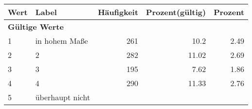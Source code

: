      \begin{longtable}{lXrrr}
     \toprule
     \textbf{Wert} & \textbf{Label} & \textbf{Häufigkeit} & \textbf{Prozent(gültig)} & \textbf{Prozent} \\
     \endhead
     \midrule
     \multicolumn{5}{l}{\textbf{Gültige Werte}}\\

     1 &
     \multicolumn{1}{X}{ in hohem Maße   } &


       \num{261} &
       \num[round-mode=places,round-precision=2]{10.2} &
         \num[round-mode=places,round-precision=2]{2.49} \\

     2 &
     \multicolumn{1}{X}{ 2   } &


       \num{282} &
       \num[round-mode=places,round-precision=2]{11.02} &
         \num[round-mode=places,round-precision=2]{2.69} \\

     3 &
     \multicolumn{1}{X}{ 3   } &


       \num{195} &
       \num[round-mode=places,round-precision=2]{7.62} &
         \num[round-mode=places,round-precision=2]{1.86} \\

     4 &
     \multicolumn{1}{X}{ 4   } &


       \num{290} &
       \num[round-mode=places,round-precision=2]{11.33} &
         \num[round-mode=places,round-precision=2]{2.76} \\

     5 &
     \multicolumn{1}{X}{ überhaupt nicht   } &



\end{longtable}

